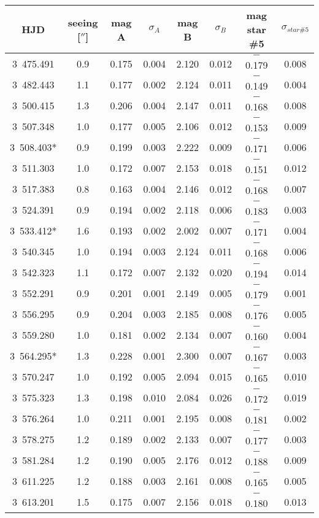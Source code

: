 \begin{table}[ht]
\begin{tabular}{cccccccc} 
\hline\hline HJD & seeing [$''$] & mag A & $\sigma_A$ & mag B & $\sigma_B$ & mag star \#5 & $\sigma_{star \#5}$ \\ \hline
3~475.491 & 0.9 & 0.175 & 0.004 & 2.120 & 0.012 & $-$0.179 & 0.008 \\ 3~482.443 & 1.1 & 0.177 & 0.002 & 2.124 & 0.011 & $-$0.149 & 0.004 \\
3~500.415 & 1.3 & 0.206 & 0.004 & 2.147 & 0.011 & $-$0.168 & 0.008 \\ 3~507.348 & 1.0 & 0.177 & 0.005 & 2.106 & 0.012 & $-$0.153 & 0.009 \\
3~508.403* & 0.9 & 0.199 & 0.003 & 2.222 & 0.009 & $-$0.171 & 0.006 \\ 3~511.303 & 1.0 & 0.172 & 0.007 & 2.153 & 0.018 & $-$0.151 & 0.012 \\
3~517.383 & 0.8 & 0.163 & 0.004 & 2.146 & 0.012 & $-$0.168 & 0.007 \\ 3~524.391 & 0.9 & 0.194 & 0.002 & 2.118 & 0.006 & $-$0.183 & 0.003 \\ 3~533.412* & 1.6 & 0.193 & 0.002 & 2.002 & 0.007 & $-$0.171 & 0.004 \\
3~540.345 & 1.0 & 0.194 & 0.003 & 2.124 & 0.011 & $-$0.168 & 0.006 \\ 3~542.323 & 1.1 & 0.172 & 0.007 & 2.132 & 0.020 & $-$0.194 & 0.014 \\ 3~552.291 & 0.9 & 0.201 & 0.001 & 2.149 & 0.005 & $-$0.179 & 0.001 \\ 3~556.295 & 0.9 & 0.204 & 0.003 & 2.185 & 0.008 & $-$0.176 & 0.005 \\ 3~559.280 & 1.0 & 0.181 & 0.002 & 2.134 & 0.007 & $-$0.160 & 0.004 \\
3~564.295* & 1.3 & 0.228 & 0.001 & 2.300 & 0.007 & $-$0.167 & 0.003 \\ 3~570.247 & 1.0 & 0.192 & 0.005 & 2.094 & 0.015 & $-$0.165 & 0.010 \\
3~575.323 & 1.3 & 0.198 & 0.010 & 2.084 & 0.026 & $-$0.172 & 0.019 \\ 3~576.264 & 1.0 & 0.211 & 0.001 & 2.195 & 0.008 & $-$0.181 & 0.002\\
3~578.275 & 1.2 & 0.189 & 0.002 & 2.133 & 0.007 & $-$0.177 & 0.003 \\ 3~581.284 & 1.2 & 0.190 & 0.005 & 2.176 & 0.012 & $-$0.188 & 0.009 \\ 3~611.225 & 1.2 & 0.188 & 0.003 & 2.161 & 0.008 & $-$0.165 & 0.005 \\ 3~613.201 & 1.5 & 0.175 & 0.007 & 2.156 & 0.018 & $-$0.180 & 0.013 \\ \hline 
\end{tabular} 
\end{table} 
